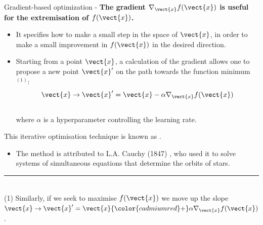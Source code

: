 \begin{frame}[t,allowframebreaks]{Gradient-based optimization -}
    {\bf The \gls{gradient} $\nabla_{\vect{x}} f(\vect{x})$ 
    is useful for the 
    \gls{extremisation} of $f(\vect{x})$.}\\
    \vspace{0.2cm}
    \begin{itemize}
        \item
            It specifies how to make a small step in the space of $\vect{x}$, 
            in order to make a small improvement in $f(\vect{x})$ 
            in the desired direction.\\
            \vspace{0.1cm}
        \item
            Starting from a point $\vect{x}$, a calculation of 
            the \gls{gradient} allows one to
            propose a new point $\vect{x}^\prime$ 
            on the path towards the function minimum$^{(1)}$:
            \begin{equation}
                \vect{x} \rightarrow \vect{x}^\prime = 
                    \vect{x} - \alpha \nabla_{\vect{x}} f(\vect{x})
                \label{eq:grad_descent_1}
            \end{equation}\\
            where $\alpha$ is a \gls{hyperparameter}
            controlling the \gls{learning rate}.
    \end{itemize}

    \vspace{0.1cm}

    This iterative \gls{optimisation} 
    technique is known as 
    .
    \begin{itemize}
      \small
      \item The method is attributed to L.A. Cauchy (1847)
       \cite{Cauchy:GradientDescent}, who used it to solve systems of
       simultaneous equations that determine the orbits of stars.
    \end{itemize}

    \vspace{0.1cm}
    \noindent\rule{4cm}{0.4pt}\\
    {\tiny
    (1) Similarly, if we seek to maximise $f(\vect{x})$ 
    we move up the slope
    $\displaystyle \vect{x} \rightarrow \vect{x}^\prime =
      \vect{x} {\color{cadmiumred}+} \alpha \nabla_{\vect{x}} f(\vect{x})$.\\
    }


\end{frame}
